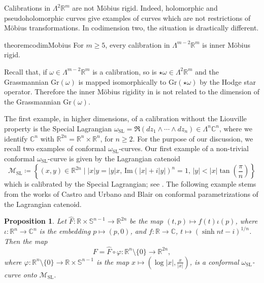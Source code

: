 \documentclass[a4paper,leqno,11pt]{amsart}
\numberwithin{equation}{section}
\newtheorem{proposition}[theorem]{Proposition}
\theoremstyle{remark}
\theoremstyle{remark}
\newcommand{\R}{\mathbb{R}}
\newcommand{\C}{\mathbb{C}}
\newcommand{\bS}{\mathbb{S}}
\newcommand{\Gr}{\mathrm{Gr}}
\newcommand{\SL}{\mathrm{SL}}
\begin{document}
Calibrations in $\Lambda^2 \R^m$ are not M\"obius rigid. Indeed, holomorphic and pseudoholomorphic curves give examples of curves which are not restrictions of M\"obius transformations. In codimension two, the situation is drastically different.

\begin{restatable}{theorem}{codimMobius}
\label{thm:codim-2}
For $m\ge 5$, every calibration in $\Lambda^{m-2} \R^m$ is inner M\"obius rigid.
\end{restatable}

Recall that, if $\omega \in \Lambda^{m-2} \R^m$ is a calibration, so is $\star \omega \in \Lambda^{2}\R^m$ and the Grassmannian $\Gr(\omega)$ is mapped isomorphically to $\Gr(\star \omega)$ by the Hodge star operator. Therefore the inner M\"obius rigidity in  is not related to the dimension of the Grassmannian $\Gr(\omega)$.

The first example, in higher dimensions, of a calibration without the Liouville property is the Special Lagrangian $\omega_\SL = \Re(dz_1\wedge \cdots \wedge dz_n) \in \Lambda^n \C^{n}$, where we identify $\mathbb{C}^n$ with $\mathbb{R}^{2n} = \R^n \times \R^n$, for $n \geq 2$. For the purpose of our discussion, we recall two examples of conformal $\omega_{\SL}$-curves. Our first example of a non-trivial conformal $\omega_\SL$-curve is given by the Lagrangian catenoid 
\[
    \mathcal{M}_\SL
    \coloneqq
    \left\{
        (x,y) \in \R^{2n}
        \mid
        |x|y = |y|x,\,
        \mathrm{Im}( |x|+i|y| )^n = 1,\,
        |y| < |x| \tan\left( \frac{\pi}{n} \right)
    \right\}
\]
which is calibrated by the Special Lagrangian; see \cite[Theorem 3.5]{Har:Law:82}. The following example stems from the works of Castro and Urbano \cite{Cas:Urb:99} and Blair \cite{Bla:07} on conformal parametrizations of the Lagrangian catenoid.

\begin{proposition}
\label{prop:SL-catenoid}
Let $\widehat F \colon \R\times \bS^{n-1} \to \R^{2n}$ be the map $(t,p) \mapsto f(t) \iota(p)$, where $\iota \colon \R^n \to \C^n$ is the embedding $p \mapsto (p,0)$, and $f \colon \R\to \C$, $t\mapsto (\sinh nt - i)^{1/n}$. Then the map
\[
F = \widehat F \circ \varphi \colon \R^n\setminus \{0\} \to \R^{2n},
\]
where $\varphi \colon \R^n\setminus \{0\} \to \R \times \bS^{n-1}$ is the map $x\mapsto \left( \log |x|, \frac{x}{|x|} \right)$, is a conformal $\omega_{\SL}$-curve onto $\mathcal{M}_\SL$.
\end{proposition}
\end{document}
